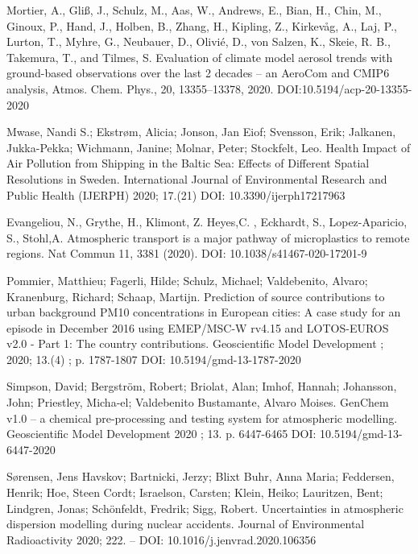 \begin{list}{}{\setlength{\leftmargin}{15pt}\setlength{\itemindent}{-\leftmargin}}
\item[]
Mortier, A., Gliß, J., Schulz, M., Aas, W., Andrews, E., Bian, H., Chin, M., Ginoux, P., Hand, J., Holben, B., Zhang, H., Kipling, Z., Kirkevåg, A., Laj, P., Lurton, T., Myhre, G., Neubauer, D., Olivié, D., von Salzen, K., Skeie, R. B., Takemura, T., and Tilmes, S.
Evaluation of climate model aerosol trends with ground-based observations over the last 2 decades – an AeroCom and CMIP6 analysis, 
Atmos. Chem. Phys., 20, 13355–13378, 2020.
DOI:10.5194/acp-20-13355-2020

\item[]
Mwase, Nandi S.; Ekstrøm, Alicia; Jonson, Jan Eiof; Svensson, Erik; Jalkanen, Jukka-Pekka; Wichmann, Janine; Molnar, Peter; Stockfelt, Leo.
Health Impact of Air Pollution from Shipping in the Baltic Sea: Effects of Different Spatial Resolutions in Sweden.
International Journal of Environmental Research and Public Health (IJERPH) 2020; 17.(21)
DOI: 10.3390/ijerph17217963 

\item[]
Evangeliou, N., Grythe, H., Klimont, Z.  Heyes,C. , Eckhardt, S., Lopez-Aparicio, S., Stohl,A. 
Atmospheric transport is a major pathway of microplastics to remote regions. 
Nat Commun 11, 3381 (2020). 
DOI: 10.1038/s41467-020-17201-9

\item[]
Pommier, Matthieu; Fagerli, Hilde; Schulz, Michael; Valdebenito, Alvaro; Kranenburg, Richard; Schaap, Martijn.
Prediction of source contributions to urban background PM10 concentrations in European cities: A case study for an episode in December 2016 using EMEP/MSC-W rv4.15 and LOTOS-EUROS v2.0 - Part 1: The country contributions.
Geoscientific Model Development ; 2020; 13.(4) ; p. 1787-1807
DOI: 10.5194/gmd-13-1787-2020 

\item[]
Simpson, David; Bergström, Robert; Briolat, Alan; Imhof, Hannah; Johansson, John; Priestley, Micha-el;
Valdebenito Bustamante, Alvaro Moises.
GenChem v1.0 – a chemical pre-processing and testing system for atmospheric modelling.
Geoscientific Model Development 2020 ; 13. p. 6447-6465
DOI: 10.5194/gmd-13-6447-2020 

\item[]
Sørensen, Jens Havskov; Bartnicki, Jerzy; Blixt Buhr, Anna Maria; Feddersen, Henrik; Hoe, Steen Cordt; Israelson, Carsten; Klein, Heiko; Lauritzen, Bent; Lindgren, Jonas; Schönfeldt, Fredrik; Sigg, Robert.
Uncertainties in atmospheric dispersion modelling during nuclear accidents.
Journal of Environmental Radioactivity 2020; 222. –
DOI: 10.1016/j.jenvrad.2020.106356 


\end{list}
